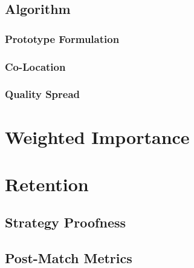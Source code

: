 \documentclass[mnsc,nonblindrev]{informs3} %
\begin{document}


\subsection{Algorithm}



\subsubsection{Prototype Formulation}
\label{Matching}



\subsubsection{Co-Location}
\label{CoLocation}



\subsubsection{Quality Spread}
\label{QualitySpread}



\section{Weighted Importance}
\label{Importance}



\section{Retention}
\label{Retention}



\subsection{Strategy Proofness}



\subsection{Post-Match Metrics}\label{post-match}


\end{document}
